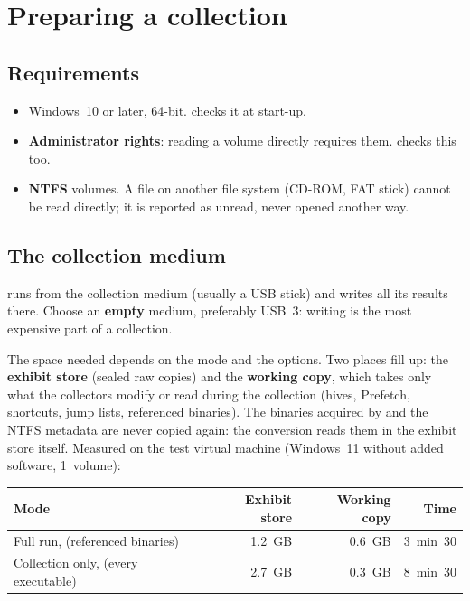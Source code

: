 \documentclass[11pt,a4paper,oneside]{report}
\begin{document}
\chapter{Preparing a collection}

\section{Requirements}

\begin{itemize}
  \item Windows~10 or later, 64-bit. \wac{} checks it at start-up.
  \item \textbf{Administrator rights}: reading a volume directly requires them.
        \wac{} checks this too.
  \item \textbf{NTFS} volumes. A file on another file system (CD-ROM, FAT stick)
        cannot be read directly; it is reported as unread, never opened another
        way.
\end{itemize}

\section{The collection medium}\label{sec:place}

\wac{} runs from the collection medium (usually a USB stick) and writes all its
results there. Choose an \textbf{empty} medium, preferably USB~3: writing is the
most expensive part of a collection.

The space needed depends on the mode and the options. Two places fill up: the
\textbf{exhibit store} (sealed raw copies) and the \textbf{working copy}, which
takes only what the collectors modify or read during the collection (hives,
Prefetch, shortcuts, jump lists, referenced binaries). The binaries acquired by
  and the NTFS metadata are never copied again: the
conversion reads them in the exhibit store itself. Measured on the test virtual
machine (Windows~11 without added software, 1~volume):

\begin{center}
\begin{tabular}{@{}L{7.4cm}rrr@{}}
\toprule
Mode & Exhibit store & Working copy & Time \\
\midrule
Full run,   (referenced binaries) & 1.2~GB & 0.6~GB & 3~min~30 \\
Collection only,    (every executable) & 2.7~GB & 0.3~GB & 8~min~30 \\
\bottomrule
\end{tabular}
\end{center}
\end{document}
